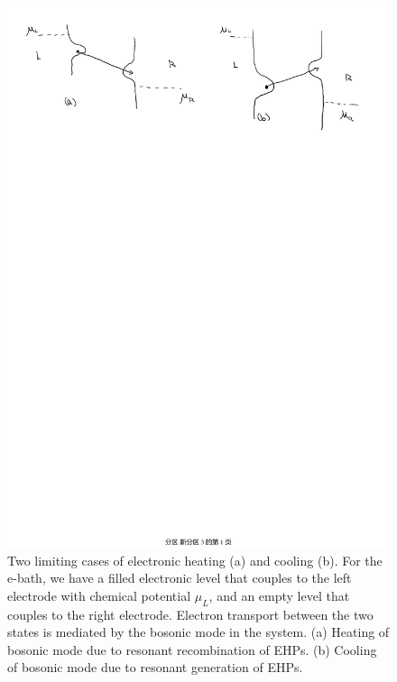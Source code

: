 \documentclass[aps
,twocolumn
,floatfix,footinbib,prl
]{revtex4-1}
\begin{document}
\begin{figure}[h]
	\includegraphics[scale=0.45,angle=0]{heating-cooling.pdf}
	\caption{Two limiting cases of electronic heating (a) and cooling (b). For the e-bath, we have a filled electronic level that couples to the left electrode with chemical potential $\mu_L$, and an empty level that couples to the right electrode. Electron transport between the two states is mediated by the bosonic mode in the system.  (a) Heating of bosonic mode due to resonant recombination of EHPs. (b) Cooling of bosonic mode due to resonant generation of EHPs.}
	\label{fig:resonant}
\end{figure}
\end{document}
